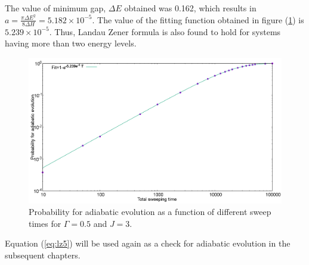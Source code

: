 \documentclass[../main.tex]{subfiles}
\begin{document}
The value of minimum gap, $\Delta E$ obtained was 0.162, which results in $a=\frac{\pi \Delta E^2}{8 \Delta H}= 5.182 \times 10^{-5}$. The value of the fitting function obtained in figure (\ref{fig:lz7}) is $5.239 \times 10^{-5}$. Thus, Landau Zener formula is also found to hold for systems having more than two energy levels.
\begin{figure}[H]
\centering 
\includegraphics[scale=0.3, width=6.5in]{Probability_H100.png}
\caption{Probability for adiabatic evolution as a function of different sweep times for $\Gamma=0.5$ and $J=3$.}
\label{fig:lz7}
\end{figure}
Equation (\ref{eq:lz5}) will be used again as a check for adiabatic evolution in the subsequent chapters.
\end{document}

